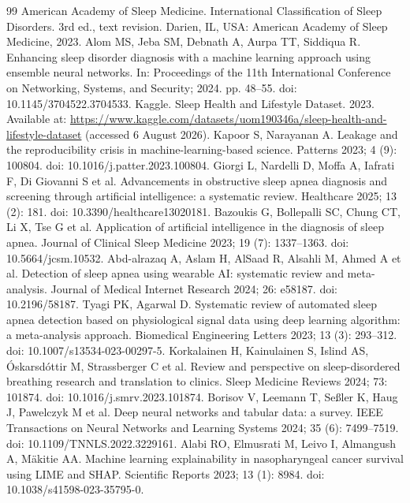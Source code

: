 \documentclass{elektr}
\begin{document}
\begin{thebibliography}{99}
 American Academy of Sleep Medicine. International Classification of Sleep Disorders. 3rd ed., text revision. Darien, IL, USA: American Academy of Sleep Medicine, 2023.
 Alom MS, Jeba SM, Debnath A, Aurpa TT, Siddiqua R. Enhancing sleep disorder diagnosis with a machine learning approach using ensemble neural networks. In: Proceedings of the 11th International Conference on Networking, Systems, and Security; 2024. pp. 48--55. doi: 10.1145/3704522.3704533.
 Kaggle. Sleep Health and Lifestyle Dataset. 2023. Available at: \url{https://www.kaggle.com/datasets/uom190346a/sleep-health-and-lifestyle-dataset} (accessed 6 August 2026).
 Kapoor S, Narayanan A. Leakage and the reproducibility crisis in machine-learning-based science. Patterns 2023; 4 (9): 100804. doi: 10.1016/j.patter.2023.100804.
 Giorgi L, Nardelli D, Moffa A, Iafrati F, Di Giovanni S et al. Advancements in obstructive sleep apnea diagnosis and screening through artificial intelligence: a systematic review. Healthcare 2025; 13 (2): 181. doi: 10.3390/healthcare13020181.
 Bazoukis G, Bollepalli SC, Chung CT, Li X, Tse G et al. Application of artificial intelligence in the diagnosis of sleep apnea. Journal of Clinical Sleep Medicine 2023; 19 (7): 1337--1363. doi: 10.5664/jcsm.10532.
 Abd-alrazaq A, Aslam H, AlSaad R, Alsahli M, Ahmed A et al. Detection of sleep apnea using wearable AI: systematic review and meta-analysis. Journal of Medical Internet Research 2024; 26: e58187. doi: 10.2196/58187.
 Tyagi PK, Agarwal D. Systematic review of automated sleep apnea detection based on physiological signal data using deep learning algorithm: a meta-analysis approach. Biomedical Engineering Letters 2023; 13 (3): 293--312. doi: 10.1007/s13534-023-00297-5.
 Korkalainen H, Kainulainen S, Islind AS, {\'{O}}skarsd{\'{o}}ttir M, Strassberger C et al. Review and perspective on sleep-disordered breathing research and translation to clinics. Sleep Medicine Reviews 2024; 73: 101874. doi: 10.1016/j.smrv.2023.101874.
 Borisov V, Leemann T, Se{\ss}ler K, Haug J, Pawelczyk M et al. Deep neural networks and tabular data: a survey. IEEE Transactions on Neural Networks and Learning Systems 2024; 35 (6): 7499--7519. doi: 10.1109/\allowbreak TNNLS.2022.3229161.
 Alabi RO, Elmusrati M, Leivo I, Almangush A, M{\"a}kitie AA. Machine learning explainability in nasopharyngeal cancer survival using LIME and SHAP. Scientific Reports 2023; 13 (1): 8984. doi: 10.1038/s41598-023-35795-0.

\end{thebibliography}
\end{document}
